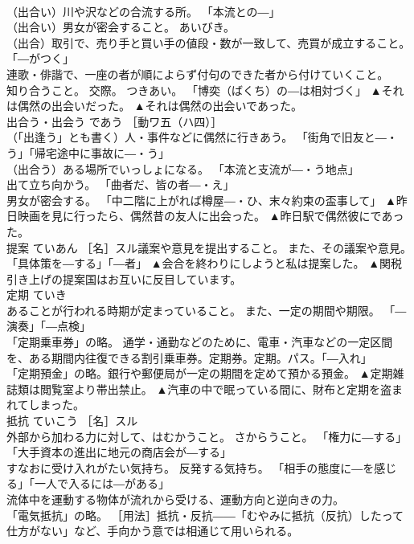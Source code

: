 \documentclass[8pt]{extreport}
\begin{document}
\begin{CJK}{UTF8}{min}
\\	（出合い）川や沢などの合流する所。 「本流との―」 
\\	（出合い）男女が密会すること。 あいびき。 
\\	（出合）取引で、売り手と買い手の値段・数が一致して、売買が成立すること。 「―がつく」 
\\	連歌・俳諧で、一座の者が順によらず付句のできた者から付けていくこと。 
\\	知り合うこと。 交際。 つきあい。 「博奕（ばくち）の―は相対づく」	▲それは偶然の出会いだった。 ▲それは偶然の出会いであった。
\\	出合う・出会う	であう	［動ワ五（ハ四）］ 
\\	（「出逢う」とも書く）人・事件などに偶然に行きあう。 「街角で旧友と―・う」「帰宅途中に事故に―・う」 
\\	（出合う）ある場所でいっしょになる。 「本流と支流が―・う地点」 
\\	出て立ち向かう。 「曲者だ、皆の者―・え」 
\\	男女が密会する。 「中二階に上がれば樽屋―・ひ、末々約束の盃事して」	▲昨日映画を見に行ったら、偶然昔の友人に出会った。 ▲昨日駅で偶然彼にであった。
\\	提案	ていあん	［名］スル議案や意見を提出すること。 また、その議案や意見。 「具体策を―する」「―者」	▲会合を終わりにしようと私は提案した。 ▲関税引き上げの提案国はお互いに反目しています。
\\	定期	ていき	
\\	あることが行われる時期が定まっていること。 また、一定の期間や期限。 「―演奏」「―点検」 
\\	「定期乗車券」の略。 通学・通勤などのために、電車・汽車などの一定区間を、ある期間内往復できる割引乗車券。定期券。定期。パス。「―入れ」 
\\	「定期預金」の略。銀行や郵便局が一定の期間を定めて預かる預金。	▲定期雑誌類は閲覧室より帯出禁止。 ▲汽車の中で眠っている間に、財布と定期を盗まれてしまった。
\\	抵抗	ていこう	［名］スル 
\\	外部から加わる力に対して、はむかうこと。 さからうこと。 「権力に―する」「大手資本の進出に地元の商店会が―する」 
\\	すなおに受け入れがたい気持ち。 反発する気持ち。 「相手の態度に―を感じる」「一人で入るには―がある」 
\\	流体中を運動する物体が流れから受ける、運動方向と逆向きの力。 
\\	「電気抵抗」の略。 ［用法］抵抗・反抗――「むやみに抵抗（反抗）したって仕方がない」など、手向かう意では相通じて用いられる。 

\end{CJK}
\end{document}
